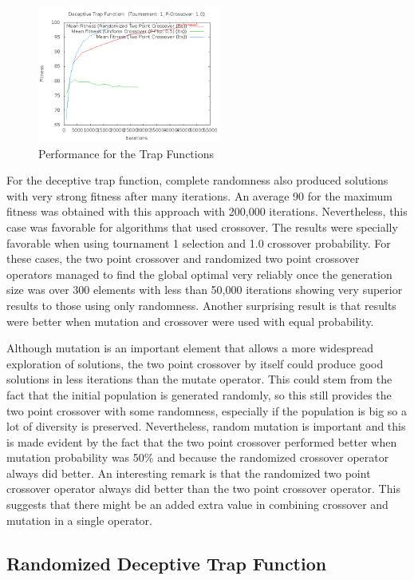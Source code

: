\documentclass[10pt]{article}
\begin{document}
\begin{figure}[h!]
    \includegraphics[height=170px]{img/DeceptiveTrapFunctionCrossoverFitness.png}
    \caption[Performance for the Trap Functions]{Performance for the Trap Functions}
\end{figure}

For the deceptive trap function, complete randomness also produced solutions with very strong fitness after many iterations. An average 90 for the maximum fitness was obtained with this approach with 200,000 iterations. Nevertheless, this case was favorable for algorithms that used crossover. The results were specially favorable when using tournament 1 selection and 1.0 crossover probability. For these cases, the two point crossover and randomized two point crossover operators managed to find the global optimal very reliably once the generation size was over 300 elements with less than 50,000 iterations showing very superior results to those using only randomness. Another surprising result is that results were better when mutation and crossover were used with equal probability. 

Although mutation is an important element that allows a more widespread exploration of solutions, the two point crossover by itself could produce good solutions in less iterations than the mutate operator. This could stem from the fact that the initial population is generated randomly, so this still provides the two point crossover with some randomness, especially if the population is big so a lot of diversity is preserved. Nevertheless, random mutation is important and this is made evident by the fact that the two point crossover performed better when mutation probability was 50\% and because the randomized crossover operator always did better. An interesting remark is that the randomized two point crossover operator always did better than the two point crossover operator. This suggests that there might be an added extra value in combining crossover and mutation in a single operator.

\pagebreak
\subsection{Randomized Deceptive Trap Function}
\end{document}
